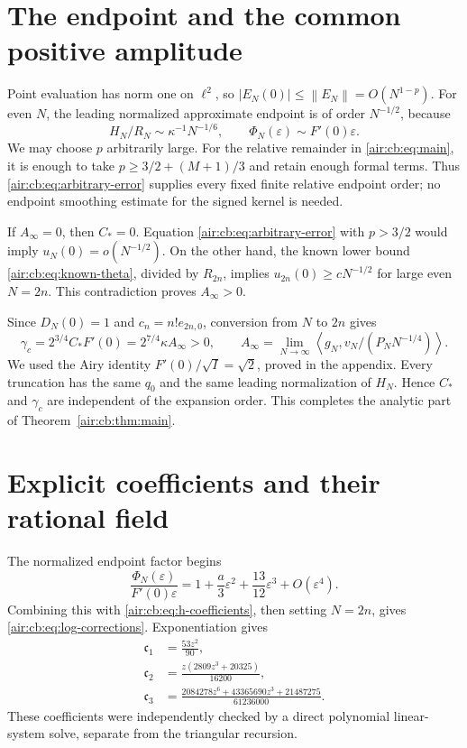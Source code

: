 \documentclass[11pt,letterpaper]{article}
\numberwithin{equation}{section}
\theoremstyle{remark}
\newcommand{\norm}[1]{\left\lVert#1\right\rVert}
\newcommand{\ip}[2]{\left\langle#1,#2\right\rangle}
\newcommand{\eps}{\varepsilon}
\begin{document}
\section{The endpoint and the common positive amplitude}

Point evaluation has norm one on $\ell^2$, so
$|E_N(0)|\le\norm{E_N}=O(N^{1-p})$. For even $N$, the leading normalized approximate
endpoint is of order $N^{-1/2}$, because
\[
H_N/R_N\sim\kappa^{-1}N^{-1/6},\qquad
\Phi_N(\eps)\sim F'(0)\eps.
\]
We may choose $p$ arbitrarily large. For the relative remainder in
\eqref{air:cb:eq:main}, it is enough to take
$p\ge3/2+(M+1)/3$ and retain enough formal terms. Thus
\eqref{air:cb:eq:arbitrary-error} supplies every fixed finite relative endpoint
order; no endpoint smoothing estimate for the signed kernel is needed.

If $A_\infty=0$, then $C_*=0$. Equation \eqref{air:cb:eq:arbitrary-error} with
$p>3/2$ would imply $u_N(0)=o(N^{-1/2})$. On the other hand, the known
lower bound \eqref{air:cb:eq:known-theta}, divided by $R_{2n}$, implies
$u_{2n}(0)\ge cN^{-1/2}$ for large even $N=2n$. This contradiction proves
$A_\infty>0$.

Since $D_N(0)=1$ and $c_n=n!e_{2n,0}$, conversion from $N$ to $2n$ gives
\begin{equation}\label{air:cb:eq:gamma}
\boxed{\quad
\gamma_c=2^{3/4}C_*F'(0)=2^{7/4}\kappa A_\infty>0,
\qquad A_\infty=\lim_{N\to\infty}\ip{g_N}{v_N/(P_NN^{-1/4})}.
\quad}
\end{equation}
We used the Airy identity $F'(0)/\sqrt I=\sqrt2$, proved in the appendix.
Every truncation has the same $q_0$ and the same leading normalization of
$H_N$. Hence $C_*$ and $\gamma_c$ are independent of the expansion order.
This completes the analytic part of Theorem~\ref{air:cb:thm:main}.

\section{Explicit coefficients and their rational field}\label{air:cb:sec:coefficients}

The normalized endpoint factor begins
\[
\frac{\Phi_N(\eps)}{F'(0)\eps}
=1+\frac a3\eps^2+\frac{13}{12}\eps^3+O(\eps^4).
\]
Combining this with \eqref{air:cb:eq:h-coefficients}, then setting $N=2n$,
gives \eqref{air:cb:eq:log-corrections}. Exponentiation gives
\begin{equation}\label{air:cb:eq:relative-coefficients}
\begin{aligned}
\mathfrak c_1&=\frac{53z^2}{90},\\
\mathfrak c_2&=\frac{z(2809z^3+20325)}{16200},\\
\mathfrak c_3&=\frac{2084278z^6+43365690z^3+21487275}{61236000}.
\end{aligned}
\end{equation}
These coefficients were independently checked by a direct polynomial
linear-system solve, separate from the triangular recursion.
\end{document}
